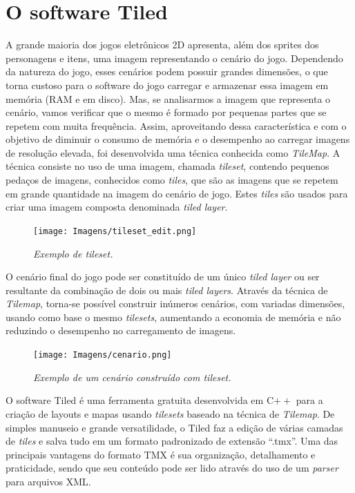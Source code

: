 \documentclass[a4paper,12pt]{report}
\begin{document}
\section{O software Tiled}
\label{tiled}
%
A grande maioria dos jogos eletrônicos 2D apresenta, além dos sprites dos personagens e itens, uma imagem representando o cenário do jogo.
Dependendo da natureza do jogo, esses cenários podem possuir grandes dimensões, o que torna custoso para o software do jogo carregar e 
armazenar essa imagem em memória (RAM e em disco). Mas, se analisarmos a imagem que representa o cenário, vamos verificar que o mesmo é formado
por pequenas partes que se repetem com muita frequência. Assim, aproveitando dessa característica e com o objetivo de diminuir o consumo de
memória e o desempenho ao carregar imagens de resolução elevada, foi desenvolvida uma técnica conhecida como \textit{TileMap}. A técnica
consiste no uso de uma imagem, chamada \textit{tileset}, contendo pequenos pedaços de imagens, conhecidos como \textit{tiles}, que são
as imagens que se repetem em grande quantidade na imagem do cenário de jogo. Estes \textit{tiles} são usados 
para criar uma imagem composta denominada \textit{tiled layer}.
%
%
\begin{figure}[H]
    \centering
    \texttt{[image: Imagens/tileset\_edit.png]}
    \caption{\textit{Exemplo de \textit{tileset}.}}
    \label{tileset_example}
\end{figure}
%
\par
%
O cenário final do jogo pode ser constituído de um único \textit{tiled layer} ou ser resultante da combinação 
de dois ou mais \textit{tiled layers}. Através da técnica de \textit{Tilemap}, torna-se possível construir inúmeros cenários,
com variadas dimensões, usando como base o mesmo \textit{tilesets}, aumentando a economia de memória e não reduzindo o desempenho no carregamento de imagens.
%
%
%
\begin{figure}[H]
    \centering
    \texttt{[image: Imagens/cenario.png]}
    \caption{\textit{Exemplo de um cenário construído com tileset.}}
    \label{cenario_example}
\end{figure}
%
%
\par
O software Tiled é uma ferramenta gratuita desenvolvida em C$++$ para a criação de layouts e mapas usando \textit{tilesets}
baseado na técnica de \textit{Tilemap}. De simples manuseio e grande versatilidade, o Tiled faz a edição de várias camadas de \textit{tiles} e salva tudo em um formato padronizado de extensão ``.tmx''. Uma das principais vantagens do formato TMX é sua organização, detalhamento e praticidade, sendo que seu conteúdo pode ser lido através do uso de um \textit{parser} para arquivos XML.
\end{document}
